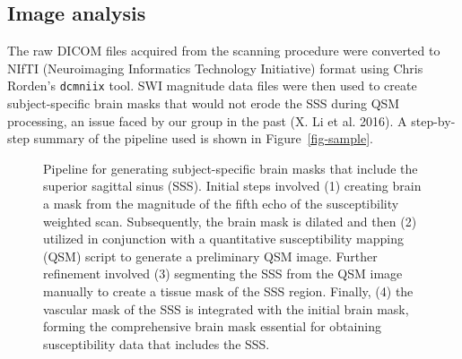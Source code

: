 \documentclass[
sn-nature
]{sn-jnl}
\begin{document}
\subsection{Image analysis}\label{image-analysis}

The raw DICOM files acquired from the scanning procedure were converted
to NIfTI (Neuroimaging Informatics Technology Initiative) format using
Chris Rorden's \texttt{dcmniix} tool. SWI magnitude data files were then
used to create subject-specific brain masks that would not erode the SSS
during QSM processing, an issue faced by our group in the past (X. Li et
al. 2016). A step-by-step summary of the pipeline used is shown in
Figure~\ref{fig-sample}.

\begin{figure}[H]


\caption{\label{fig-graph}Pipeline for generating subject-specific brain
masks that include the superior sagittal sinus (SSS). Initial steps
involved (1) creating brain a mask from the magnitude of the fifth echo
of the susceptibility weighted scan. Subsequently, the brain mask is
dilated and then (2) utilized in conjunction with a quantitative
susceptibility mapping (QSM) script to generate a preliminary QSM image.
Further refinement involved (3) segmenting the SSS from the QSM image
manually to create a tissue mask of the SSS region. Finally, (4) the
vascular mask of the SSS is integrated with the initial brain mask,
forming the comprehensive brain mask essential for obtaining
susceptibility data that includes the SSS.}

\end{figure}%
\end{document}

